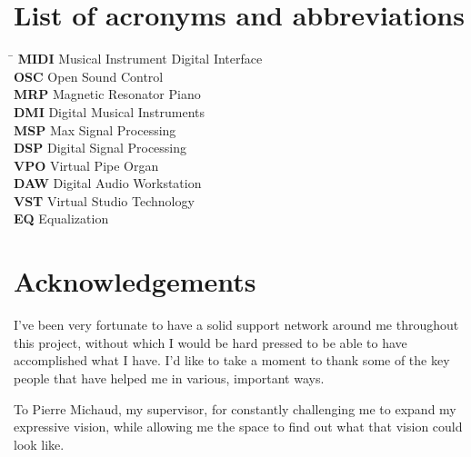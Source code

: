 \documentclass[12pt,twoside,maitrise]{dms_ks}
\theoremstyle{definition}
\begin{document}
\chapter*{List of acronyms and abbreviations}
\begin{tabbing}
    \hspace{2cm} \= \kill %
    \textbf{MIDI} \> Musical Instrument Digital Interface \\
    \textbf{OSC} \> Open Sound Control \\
    \textbf{MRP} \> Magnetic Resonator Piano \\
    \textbf{DMI} \> Digital Musical Instruments \\
    \textbf{MSP} \> Max Signal Processing \\
    \textbf{DSP} \> Digital Signal Processing \\
    \textbf{VPO} \> Virtual Pipe Organ \\
    \textbf{DAW} \> Digital Audio Workstation \\
    \textbf{VST} \> Virtual Studio Technology \\
    \textbf{EQ}  \> Equalization \\
\end{tabbing}


\chapter*{Acknowledgements}

I've been very fortunate to have a solid support network around me throughout this project, without which I would be hard pressed to be able to have accomplished what I have.
I'd like to take a moment to thank some of the key people that have helped me in various, important ways.

To Pierre Michaud, my supervisor, for constantly challenging me to expand my expressive vision, while allowing me the space to find out what that vision could look like.
\end{document}
